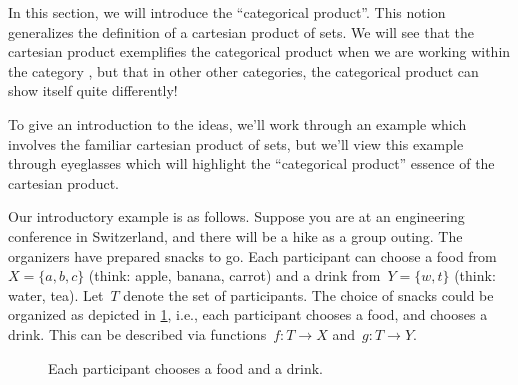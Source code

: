 

%


In this section, we will introduce the ``categorical product''.
This notion generalizes the definition of a cartesian product of sets.
We will see that the cartesian product exemplifies the categorical product when we are working within the category \Set, but that in other other categories, the categorical product can show itself quite differently!

To give an introduction to the ideas, we'll work through an example which involves the familiar cartesian product of sets, but we'll view this example through eyeglasses which will highlight the ``categorical product'' essence of the cartesian product.

Our introductory example is as follows.
Suppose you are at an engineering conference in Switzerland, and there will be a hike as a group outing.
The organizers have prepared snacks to go.
Each participant can choose a food from~$X=\{a,b,c\}$ (think: apple, banana, carrot) and a drink from~$Y=\{w,t\}$ (think: water, tea).
Let~$T$ denote the set of participants.
The choice of snacks could be organized as depicted in \cref{fig:snacks_1}, i.e., each participant chooses a food, and chooses a drink.
This can be described via functions~$f\colon T \to X$ and~$g\colon  T \to Y$.

\begin{figure}[h!]
    \begin{center}
    \end{center}
    \caption{Each participant chooses a food and a drink.}
    \label{fig:snacks_1}
\end{figure}



